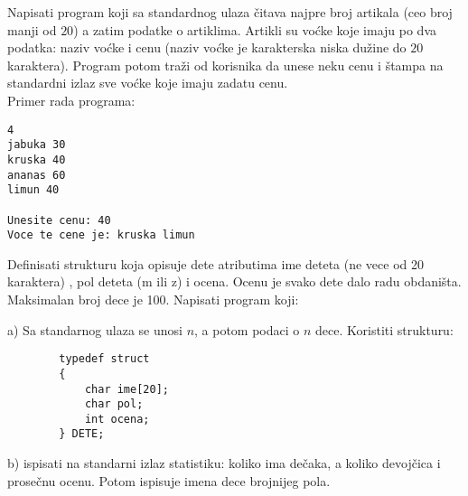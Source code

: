 \begin{Exercise}[label=p2.5_] 
Napisati program koji sa standardnog ulaza \v{c}itava najpre broj artikala
(ceo broj manji od $20$) a zatim podatke o artiklima. Artikli su vo\' cke
koje imaju po dva podatka: naziv vo\' cke i cenu (naziv vo\' cke je
karakterska niska du\v zine do $20$ karaktera).
Program potom tra\v zi od korisnika da unese neku cenu i \v stampa na
standardni izlaz sve vo\' cke koje imaju zadatu cenu.\\

Primer rada programa:

\begin{verbatim}
4
jabuka 30
kruska 40
ananas 60
limun 40

Unesite cenu: 40
Voce te cene je: kruska limun
\end{verbatim}
\end{Exercise}
\begin{Answer}[ref=p2.5_]
\end{Answer}


\begin{Exercise}[label=p2.5_] 
Definisati strukturu koja opisuje dete atributima 
ime deteta (ne vece od 20 karaktera) , pol deteta (m ili z)
i ocena. Ocenu je svako dete dalo radu obdani\v sta. Maksimalan broj dece je 100. Napisati program koji:

   \begin{description}
   \item{a)} Sa standarnog ulaza se unosi $n$, a potom podaci o $n$ dece. Koristiti strukturu:
   \begin{verbatim}
        typedef struct
        {
            char ime[20];
            char pol;
            int ocena;
        } DETE;
   \end{verbatim}

   \item{b)} ispisati na standarni izlaz statistiku: koliko ima de\v caka,
   a koliko devoj\v cica i prose\v cnu ocenu. Potom ispisuje imena dece
   brojnijeg pola.
   \end{description}
\end{Exercise}
\begin{Answer}[ref=p2.5_]
\end{Answer}


